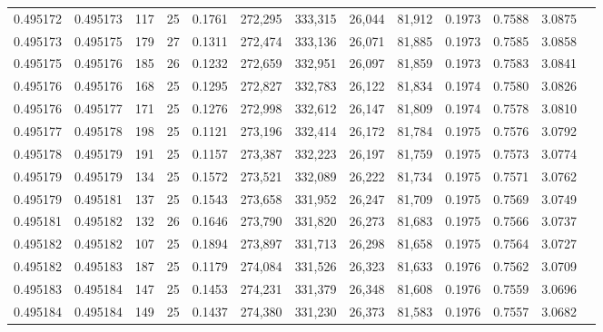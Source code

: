 \begin{tabular}{rrrrrrrrrrrrr}
0.495172 & 0.495173 & 117 &  25 &                                     0.1761 & 272,295 & 333,315 &  26,044 &  81,912 & 0.1973 & 0.7588 & 3.0875 \\
0.495173 & 0.495175 & 179 &  27 &                                     0.1311 & 272,474 & 333,136 &  26,071 &  81,885 & 0.1973 & 0.7585 & 3.0858 \\
0.495175 & 0.495176 & 185 &  26 &                                     0.1232 & 272,659 & 332,951 &  26,097 &  81,859 & 0.1973 & 0.7583 & 3.0841 \\
0.495176 & 0.495176 & 168 &  25 &                                     0.1295 & 272,827 & 332,783 &  26,122 &  81,834 & 0.1974 & 0.7580 & 3.0826 \\
0.495176 & 0.495177 & 171 &  25 &                                     0.1276 & 272,998 & 332,612 &  26,147 &  81,809 & 0.1974 & 0.7578 & 3.0810 \\
0.495177 & 0.495178 & 198 &  25 &                                     0.1121 & 273,196 & 332,414 &  26,172 &  81,784 & 0.1975 & 0.7576 & 3.0792 \\
0.495178 & 0.495179 & 191 &  25 &                                     0.1157 & 273,387 & 332,223 &  26,197 &  81,759 & 0.1975 & 0.7573 & 3.0774 \\
0.495179 & 0.495179 & 134 &  25 &                                     0.1572 & 273,521 & 332,089 &  26,222 &  81,734 & 0.1975 & 0.7571 & 3.0762 \\
0.495179 & 0.495181 & 137 &  25 &                                     0.1543 & 273,658 & 331,952 &  26,247 &  81,709 & 0.1975 & 0.7569 & 3.0749 \\
0.495181 & 0.495182 & 132 &  26 &                                     0.1646 & 273,790 & 331,820 &  26,273 &  81,683 & 0.1975 & 0.7566 & 3.0737 \\
0.495182 & 0.495182 & 107 &  25 &                                     0.1894 & 273,897 & 331,713 &  26,298 &  81,658 & 0.1975 & 0.7564 & 3.0727 \\
0.495182 & 0.495183 & 187 &  25 &                                     0.1179 & 274,084 & 331,526 &  26,323 &  81,633 & 0.1976 & 0.7562 & 3.0709 \\
0.495183 & 0.495184 & 147 &  25 &                                     0.1453 & 274,231 & 331,379 &  26,348 &  81,608 & 0.1976 & 0.7559 & 3.0696 \\
0.495184 & 0.495184 & 149 &  25 &                                     0.1437 & 274,380 & 331,230 &  26,373 &  81,583 & 0.1976 & 0.7557 & 3.0682 \\

\end{tabular}
